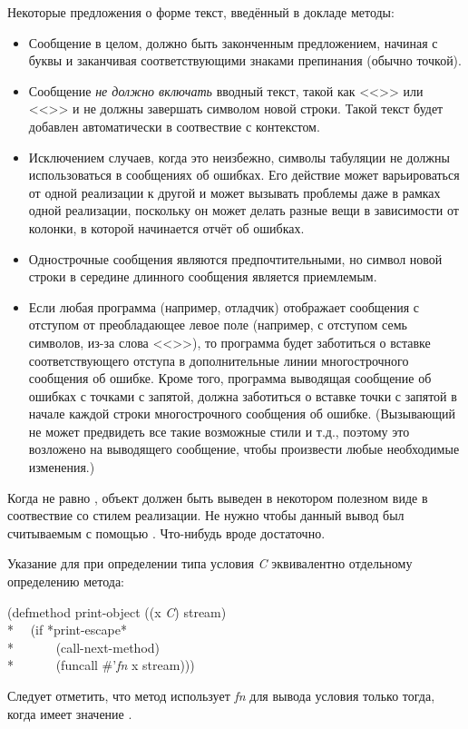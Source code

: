 Некоторые предложения о форме текст, введённый в докладе методы:
\begin{itemize}
\item Сообщение в целом, должно быть законченным предложением, начиная с буквы и
  заканчивая соответствующими знаками препинания (обычно точкой).

 \item Сообщение \emph{не должно включать} вводный текст, такой как
   <<>> или <<>> и не должны завершать символом
   новой строки. Такой текст будет добавлен автоматически в соотвествие с
   контекстом.

 \item Исключением случаев, когда это неизбежно, символы табуляции не должны
   использоваться в сообщениях об ошибках. Его действие может варьироваться от
   одной реализации к другой и может вызывать проблемы даже в рамках одной
   реализации, поскольку он может делать разные вещи в зависимости от колонки,
   в которой начинается отчёт об ошибках.

  \item Однострочные сообщения являются предпочтительными, но символ новой
    строки в середине длинного сообщения является приемлемым.

  \item Если любая программа (например, отладчик) отображает сообщения с
    отступом от преобладающее левое поле (например, с отступом семь символов,
    из-за слова <<>>), то программа будет заботиться о вставке
    соответствующего отступа в дополнительные линии многострочного сообщения об
    ошибке. Кроме того, программа выводящая сообщение об ошибках с точками с
    запятой, должна заботиться о вставке точки с запятой в начале каждой строки
    многострочного сообщения об ошибке. (Вызывающий  не может
    предвидеть все такие возможные стили и т.д., поэтому это возложено на
    выводящего сообщение, чтобы произвести любые необходимые изменения.)
\end{itemize}

Когда  не равно , объект должен быть выведен в
некотором полезном виде в соотвествие со стилем реализации. Не нужно чтобы
данный вывод был считываемым с помощью . Что-нибудь вроде
 достаточно.

Указание  для  при определении
типа условия \emph{C} эквивалентно
отдельному определению метода:
\begin{lisp}
(defmethod print-object ((x \emph{C}) stream) \\*
~~(if *print-escape* \\*
~~~~~~(call-next-method) \\*
~~~~~~(funcall \#'\emph{fn} x stream)))
\end{lisp}
Следует отметить, что метод использует \emph{fn} для вывода условия только
тогда, когда  имеет значение .

